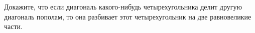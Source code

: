 \begin{ex}
	\begin{condition}
		Докажите, что если диагональ какого-нибудь четырехугольника делит другую диагональ пополам, то она разбивает этот четырехугольник на две равновеликие части.
	\end{condition}
\end{ex}
